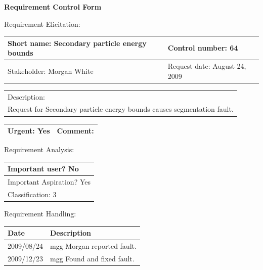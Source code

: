 \begin{center}\Large\bf
Requirement Control Form
\end{center}
\vspace{24pt}

Requirement Elicitation:

\begin{tabular}{|p{211pt}|p{211pt}|} \hline
Short name: Secondary particle energy bounds & Control number: 64\\ \hline
Stakeholder: Morgan White & Request date: August 24, 2009\\
\end{tabular}
\begin{tabular}{|p{433pt}|} \hline
Description: \\ 
Request for Secondary particle energy bounds causes segmentation fault.
\\ \hline
\end{tabular} 
\begin{tabular}{|p{211pt}|p{211pt}|} \hline
Urgent: Yes & Comment: 
\\ \hline
\end{tabular}

\vspace{24pt}

Requirement Analysis:

\begin{tabular}{|p{433pt}|} \hline
Important user? No \\ \hline
Important Aspiration? Yes \\ \hline
Classification: 3 \\ \hline
\end{tabular}
\vspace{24pt}

Requirement Handling:

\begin{tabular}{|p{72pt}|p{351pt}|} \hline
Date & Description \\ \hline
2009/08/24 & mgg Morgan reported fault. \\ \hline
2009/12/23 & mgg Found and fixed fault. \\ \hline
\end{tabular}
